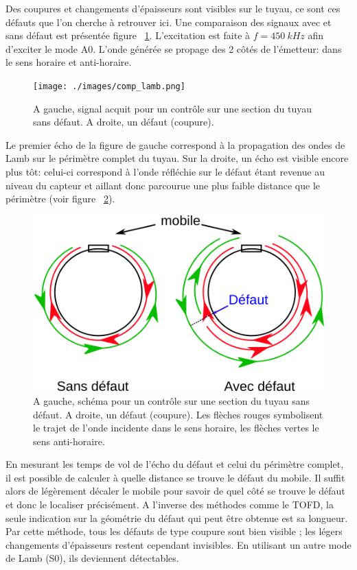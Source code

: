 \documentclass[twoside]{article}
\begin{document}
\begin{multicols}{2}
Des coupures et changements d'épaisseurs sont visibles sur le tuyau, ce sont ces défauts que l'on cherche à retrouver ici. Une comparaison des signaux avec et sans défaut est présentée figure ~\ref{fig4}. L'excitation est faite à $f = 450~kHz$ afin d'exciter le mode A0. L'onde générée se propage des 2 côtés de l'émetteur: dans le sens horaire et anti-horaire.

\begin{figure}[H]
\centering
\texttt{[image: ./images/comp\_lamb.png]}
\caption{\label{fig4} A gauche, signal acquit pour un contrôle sur une section du tuyau sans défaut. A droite, un défaut (coupure).}
\end{figure}

Le premier écho de la figure de gauche correspond à la propagation des ondes de Lamb sur le périmètre complet du tuyau. Sur la droite, un écho est visible encore plus tôt: celui-ci correspond à l'onde réfléchie sur le défaut étant revenue au niveau du capteur et aillant donc parcourue une plus faible distance que le périmètre (voir figure ~\ref{schema1}). 

\begin{figure}[H]
\centering
\includegraphics[scale=0.5]{./images/schema_comp_lamb.png}
\caption{\label{schema1} A gauche, schéma pour un contrôle sur une section du tuyau sans défaut. A droite, un défaut (coupure). Les flèches rouges symbolisent le trajet de l'onde incidente dans le sens horaire, les flèches vertes le sens anti-horaire.}
\end{figure}

En mesurant les temps de vol de l'écho du défaut et celui du périmètre complet, il est possible de calculer à quelle distance se trouve le défaut du mobile. Il suffit alors de légèrement décaler le mobile pour savoir de quel côté se trouve le défaut et donc le localiser précisément. A l'inverse des méthodes comme le TOFD, la seule indication sur la géométrie du défaut qui peut être obtenue est sa longueur. Par cette méthode, tous les défauts de type coupure sont bien visible ; les légers changements d'épaisseurs restent cependant invisibles. En utilisant un autre mode de Lamb (S0), ils deviennent détectables.\\ \bigskip



\end{multicols}
\end{document}
